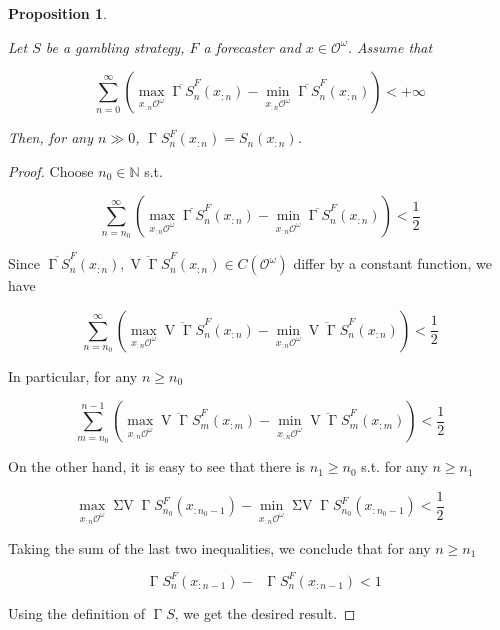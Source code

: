 \documentclass[11pt]{article}
\theoremstyle{definition}
\theoremstyle{plain}
\newtheorem{proposition}{Proposition}%
\newcommand{\Nats}{\mathbb{N}}
\newcommand{\Ob}{\mathcal{O}}
\newcommand{\OO}{\Ob^\omega}
\newcommand{\CO}{C(\OO)}
\DeclareMathOperator{\V}{V}
\DeclareMathOperator{\SV}{\Sigma V}
\DeclareMathOperator{\SVM}{\Sigma V_{\min}}
\DeclareMathOperator{\SVX}{\Sigma V_{\max}}
\DeclareMathOperator{\PG}{\Gamma}
\begin{document}
\begin{samepage}
\begin{proposition}
\label{prp:when_bounded_play}

Let $S$ be a gambling strategy, $F$ a forecaster and $x \in \OO$. Assume that

\begin{equation}
\sum_{n=0}^\infty {\left(\max_{x_{:n}\OO} \overline{\PG{S}}^F_n\left(x_{:n}\right)-\min_{x_{:n}\OO} \overline{\PG{S}}^F_n\left(x_{:n}\right)\right)} < +\infty
\end{equation}

Then, for any $n \gg 0$, $\PG{S}^F_n\left(x_{:n}\right)=S_n\left(x_{:n}\right)$.

\end{proposition}
\end{samepage}

\begin{proof}

Choose $n_0 \in \Nats$ s.t. 

$$\sum_{n=n_0}^\infty {\left(\max_{x_{:n}\OO} \overline{\PG{S}}^F_n\left(x_{:n}\right)-\min_{x_{:n}\OO} \overline{\PG{S}}^F_n\left(x_{:n}\right)\right)} < \frac{1}{2}$$

Since $\overline{\PG{S}}^F_n\left(x_{:n}\right), \overline{\V{\PG{S}}}^F_n\left(x_{:n}\right) \in \CO$ differ by a constant function, we have

$$\sum_{n=n_0}^\infty {\left(\max_{x_{:n}\OO} \overline{\V{\PG{S}}}^F_n\left(x_{:n}\right)-\min_{x_{:n}\OO} \overline{\V{\PG{S}}}^F_n\left(x_{:n}\right)\right)} < \frac{1}{2}$$

In particular, for any $n \geq n_0$

$$\sum_{m=n_0}^{n-1} {\left(\max_{x_{:n}\OO} \overline{\V{\PG{S}}}^F_m\left(x_{:m}\right)-\min_{x_{:n}\OO} \overline{\V{\PG{S}}}^F_m\left(x_{:m}\right)\right)} < \frac{1}{2}$$

On the other hand, it is easy to see that there is $n_1 \geq n_0$ s.t. for any $n \geq n_1$

$$\max_{x_{:n}\OO} \SV{\PG{S}}_{n_0}^F\left(x_{:n_0 - 1}\right) - \min_{x_{:n}\OO} \SV{\PG{S}}_{n_0}^F\left(x_{:n_0 - 1}\right) < \frac{1}{2}$$

Taking the sum of the last two inequalities, we conclude that for any $n \geq n_1$

$$\SVX{\PG{S}}_{n}^F\left(x_{:n-1}\right) - \SVM{\PG{S}}_{n}^F\left(x_{:n-1}\right) < 1$$

Using the definition of $\PG{S}$, we get the desired result.
\end{proof}
\end{document}
